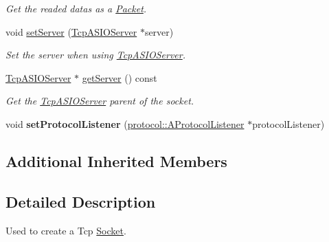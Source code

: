 \begin{DoxyCompactItemize}
\begin{DoxyCompactList}\small\item\em Get the readed datas as a \hyperlink{classmognetwork_1_1_packet}{Packet}. \end{DoxyCompactList}\item 
void \hyperlink{classmognetwork_1_1_tcp_socket_ae35e2fd8fbf6f9d3bdb87650b3bedff1}{set\-Server} (\hyperlink{classmognetwork_1_1_tcp_a_s_i_o_server}{Tcp\-A\-S\-I\-O\-Server} $\ast$server)
\begin{DoxyCompactList}\small\item\em Set the server when using \hyperlink{classmognetwork_1_1_tcp_a_s_i_o_server}{Tcp\-A\-S\-I\-O\-Server}. \end{DoxyCompactList}\item 
\hyperlink{classmognetwork_1_1_tcp_a_s_i_o_server}{Tcp\-A\-S\-I\-O\-Server} $\ast$ \hyperlink{classmognetwork_1_1_tcp_socket_ab07f10a9f78168c051e7429e7f45a95f}{get\-Server} () const 
\begin{DoxyCompactList}\small\item\em Get the \hyperlink{classmognetwork_1_1_tcp_a_s_i_o_server}{Tcp\-A\-S\-I\-O\-Server} parent of the socket. \end{DoxyCompactList}\item 
\hypertarget{classmognetwork_1_1_tcp_socket_ac2d93924161e6daa8f166a6f634a46a5}{void {\bfseries set\-Protocol\-Listener} (\hyperlink{classmognetwork_1_1protocol_1_1_a_protocol_listener}{protocol\-::\-A\-Protocol\-Listener} $\ast$protocol\-Listener)}\label{classmognetwork_1_1_tcp_socket_ac2d93924161e6daa8f166a6f634a46a5}

\end{DoxyCompactItemize}
\subsection*{Additional Inherited Members}


\subsection{Detailed Description}
Used to create a Tcp \hyperlink{classmognetwork_1_1_socket}{Socket}. 


